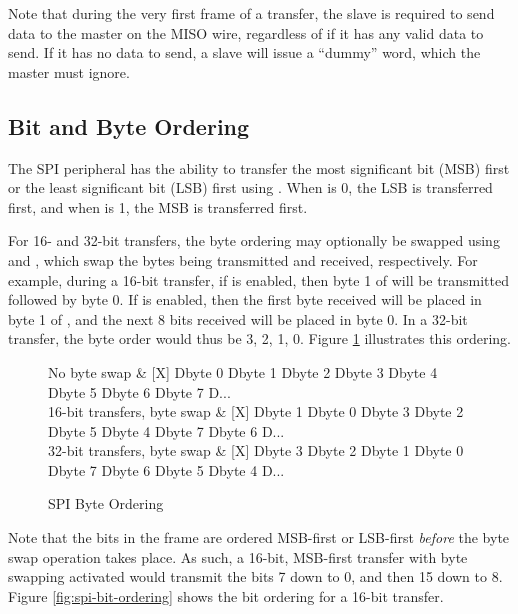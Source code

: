 Note that during the very first frame of a transfer, the slave is required to send data to the master on the MISO wire, regardless of if it has any valid data to send. If it has no data to send, a slave will issue a ``dummy'' word, which the master must ignore.



\subsection{Bit and Byte Ordering}

The SPI peripheral has the ability to transfer the most significant bit (MSB) first or the least significant bit (LSB) first using . When  is 0, the LSB is transferred first, and when  is 1, the MSB is transferred first.

For 16- and 32-bit transfers, the byte ordering may optionally be swapped using  and , which swap the bytes being transmitted and received, respectively. For example, during a 16-bit transfer, if  is enabled, then byte 1 of  will be transmitted followed by byte 0. If  is enabled, then the first byte received will be placed in byte 1 of , and the next 8 bits received will be placed in byte 0. In a 32-bit transfer, the byte order would thus be 3, 2, 1, 0. Figure \ref{fig:spi-byte-ordering} illustrates this ordering.

\begin{figure}[htpb]
	\begin{tikztimingtable}[timing/font=\rmfamily, timing/d/text/.append style={font=\rmfamily}, xscale=4, timing/slope=0.1, timing/dslope=0.2]
		No byte swap                & [X] D{byte 0} D{byte 1} D{byte 2} D{byte 3} D{byte 4} D{byte 5} D{byte 6} D{byte 7} D{...} \\
		16-bit transfers, byte swap & [X] D{byte 1} D{byte 0} D{byte 3} D{byte 2} D{byte 5} D{byte 4} D{byte 7} D{byte 6} D{...} \\
		32-bit transfers, byte swap & [X] D{byte 3} D{byte 2} D{byte 1} D{byte 0} D{byte 7} D{byte 6} D{byte 5} D{byte 4} D{...} \\
	\end{tikztimingtable}
	\caption{SPI Byte Ordering}
	\label{fig:spi-byte-ordering}
\end{figure}

Note that the bits in the frame are ordered MSB-first or LSB-first \textit{before} the byte swap operation takes place. As such, a 16-bit, MSB-first transfer with byte swapping activated would transmit the bits 7 down to 0, and then 15 down to 8. Figure \ref{fig:spi-bit-ordering} shows the bit ordering for a 16-bit transfer.

